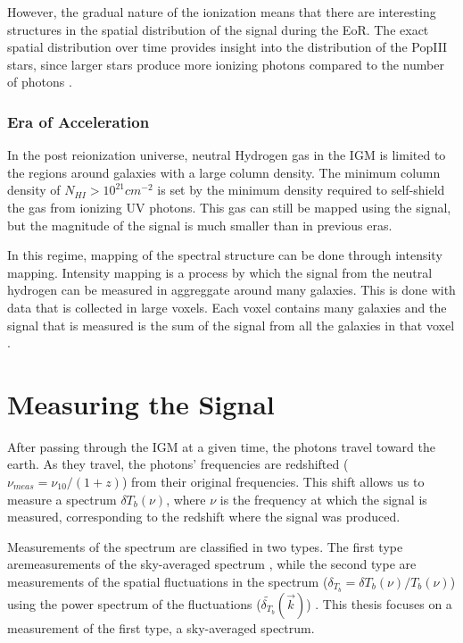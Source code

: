 However, the gradual nature of the ionization means that there are interesting structures in the spatial distribution of the \cm signal during the EoR. The exact spatial distribution over time provides insight into the distribution of the PopIII stars, since larger stars produce more ionizing photons compared to the number of \lya  photons \cite{furlanetto_2006}. 

\subsubsection{Era of Acceleration}
In the post reionization universe, neutral Hydrogen gas in the IGM is limited to the regions around galaxies with a large column density. The minimum column density of $N_{HI}>10^{21} cm^{-2}$ is set by the minimum density required to self-shield the gas from ionizing UV photons. This gas can still be mapped using the \cm signal, but the magnitude of the signal is much smaller than in previous eras. 

In this regime, mapping of the spectral structure can be done through intensity mapping. Intensity mapping is a process by which the signal from the neutral hydrogen can be measured in aggreggate around many galaxies. This is done with data that is collected in large voxels. Each voxel contains many galaxies and the \cm signal that is measured is the sum of the \cm signal from all the galaxies in that voxel \cite{masui_2012}.

\section{Measuring the \cm Signal}
After passing through the IGM at a given time, the \cm photons travel toward the earth. As they travel, the photons' frequencies are redshifted ($\nu_{meas} = \nu_{10}/(1+z)$) from their original frequencies. This shift allows us to measure a spectrum $\delta T_b (\nu)$, where $\nu$ is the frequency at which the signal is measured, corresponding to the redshift where the signal was produced. 

Measurements of the \cm spectrum are classified in two types. The first type aremeasurements of the sky-averaged spectrum \avgdtb, while the second type are measurements of the spatial fluctuations in the \cm spectrum ($\delta_{T_b} =  \delta T_b (\nu)/ T_b (\nu)$) using the power spectrum of the fluctuations ($ \tilde{ \delta_{T_b} } ( \vec{k} )$) \cite{natarajan_2014}. This thesis focuses on a measurement of the first type, a sky-averaged spectrum. 


